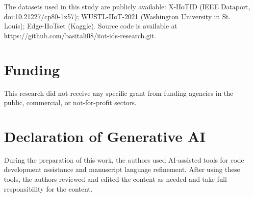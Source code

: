 \documentclass[a4paper,fleqn]{cas-sc}
\begin{document}
The datasets used in this study are publicly available: X-IIoTID (IEEE Dataport, doi:10.21227/cp80-1x57); WUSTL-IIoT-2021 (Washington University in St. Louis); Edge-IIoTset (Kaggle). Source code is available at https://github.com/basitali08/iiot-ids-research.git.

\section*{Funding}

This research did not receive any specific grant from funding agencies in the public, commercial, or not-for-profit sectors.

\section*{Declaration of Generative AI}

During the preparation of this work, the authors used AI-assisted tools for code development assistance and manuscript language refinement. After using these tools, the authors reviewed and edited the content as needed and take full responsibility for the content.



\end{document}
